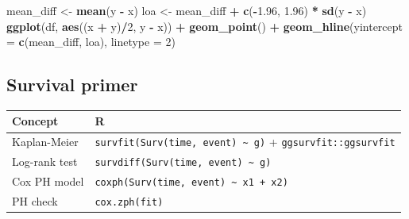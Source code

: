 \documentclass[
]{article}
\newenvironment{Shaded}{\begin{snugshade}}{\end{snugshade}}
\newcommand{\AttributeTok}[1]{\textcolor[rgb]{0.13,0.29,0.53}{#1}}
\newcommand{\DecValTok}[1]{\textcolor[rgb]{0.00,0.00,0.81}{#1}}
\newcommand{\FloatTok}[1]{\textcolor[rgb]{0.00,0.00,0.81}{#1}}
\newcommand{\FunctionTok}[1]{\textcolor[rgb]{0.13,0.29,0.53}{\textbf{#1}}}
\newcommand{\NormalTok}[1]{#1}
\newcommand{\OtherTok}[1]{\textcolor[rgb]{0.56,0.35,0.01}{#1}}
\newcommand{\SpecialCharTok}[1]{\textcolor[rgb]{0.81,0.36,0.00}{\textbf{#1}}}
\newcounter{none} %
\begin{document}
\begin{Shaded}
\begin{Highlighting}[]
\NormalTok{mean\_diff }\OtherTok{\textless{}{-}} \FunctionTok{mean}\NormalTok{(y }\SpecialCharTok{{-}}\NormalTok{ x)}
\NormalTok{loa }\OtherTok{\textless{}{-}}\NormalTok{ mean\_diff }\SpecialCharTok{+} \FunctionTok{c}\NormalTok{(}\SpecialCharTok{{-}}\FloatTok{1.96}\NormalTok{, }\FloatTok{1.96}\NormalTok{) }\SpecialCharTok{*} \FunctionTok{sd}\NormalTok{(y }\SpecialCharTok{{-}}\NormalTok{ x)}
\FunctionTok{ggplot}\NormalTok{(df, }\FunctionTok{aes}\NormalTok{((x }\SpecialCharTok{+}\NormalTok{ y)}\SpecialCharTok{/}\DecValTok{2}\NormalTok{, y }\SpecialCharTok{{-}}\NormalTok{ x)) }\SpecialCharTok{+} \FunctionTok{geom\_point}\NormalTok{() }\SpecialCharTok{+}
  \FunctionTok{geom\_hline}\NormalTok{(}\AttributeTok{yintercept =} \FunctionTok{c}\NormalTok{(mean\_diff, loa), }\AttributeTok{linetype =} \DecValTok{2}\NormalTok{)}
\end{Highlighting}
\end{Shaded}

\subsection{Survival primer}\label{survival-primer}

{\def\LTcaptype{none} %
\begin{longtable}[]{@{}
  >{\raggedright\arraybackslash}p{}
  >{\raggedright\arraybackslash}p{}@{}}
\toprule\noalign{}
\begin{minipage}[b]{\linewidth}\raggedright
Concept
\end{minipage} & \begin{minipage}[b]{\linewidth}\raggedright
R
\end{minipage} \\
\midrule\noalign{}
\endhead
\bottomrule\noalign{}
\endlastfoot
Kaplan-Meier &
\texttt{survfit(Surv(time,\ event)\ \textasciitilde{}\ g)} +
\texttt{ggsurvfit::ggsurvfit} \\
Log-rank test &
\texttt{survdiff(Surv(time,\ event)\ \textasciitilde{}\ g)} \\
Cox PH model &
\texttt{coxph(Surv(time,\ event)\ \textasciitilde{}\ x1\ +\ x2)} \\
PH check & \texttt{cox.zph(fit)} \\
\end{longtable}
}
\end{document}
